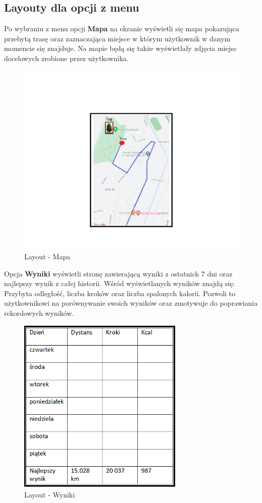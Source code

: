\subsection{Layouty dla opcji z menu}
Po wybraniu z menu opcji \textbf{Mapa} na ekranie wyświetli się mapa pokazująca przebytą trasę oraz zaznaczająca miejsce w którym użytkownik w danym momencie się znajduje.
Na mapie będą się także wyświetlały zdjęcia miejsc docelowych zrobione przez użytkownika.
\begin{figure}[!htb]
	\begin{center}
		\includegraphics[width=16cm]{rys/Mapa.png}
		\caption{Layout - Mapa}
		\label{rys:rysunek003}
	\end{center}
\end{figure}
\newline Opcja \textbf{Wyniki} wyświetli stronę zawierającą wyniki z ostatnich 7 dni oraz najlepszy wynik z całej historii. Wśród wyświetlanych wyników znajdą się: Przybyta odległość, liczba kroków oraz liczba spalonych kalorii. Pozwoli to użytkownikowi na porównywanie swoich wyników oraz zmotywuje do poprawiania rekordowych wyników.
\begin{figure}[!htb]
	\begin{center}
		\includegraphics[width=8cm]{rys/Wyniki.png}
		\caption{Layout - Wyniki}
		\label{rys:rysunek004}
	\end{center}
\end{figure}
